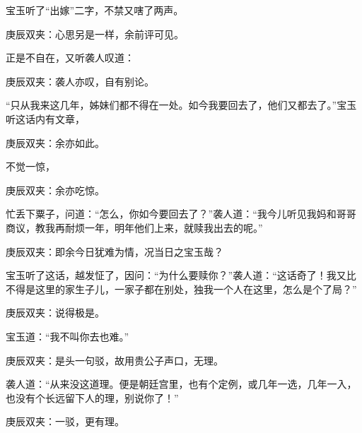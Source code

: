 \begin{parag}
    宝玉听了“出嫁”二字，不禁又嗐了两声。\begin{note}庚辰双夹：心思另是一样，余前评可见。\end{note}正是不自在，又听袭人叹道：\begin{note}庚辰双夹：袭人亦叹，自有别论。\end{note}“只从我来这几年，姊妹们都不得在一处。如今我要回去了，他们又都去了。”宝玉听这话内有文章，\begin{note}庚辰双夹：余亦如此。\end{note}不觉一惊，\begin{note}庚辰双夹：余亦吃惊。\end{note}忙丢下粟子，问道：“怎么，你如今要回去了？”袭人道：“我今儿听见我妈和哥哥商议，教我再耐烦一年，明年他们上来，就赎我出去的呢。”\begin{note}庚辰双夹：即余今日犹难为情，况当日之宝玉哉？\end{note}宝玉听了这话，越发怔了，因问：“为什么要赎你？”袭人道：“这话奇了！我又比不得是这里的家生子儿，一家子都在别处，独我一个人在这里，怎么是个了局？”\begin{note}庚辰双夹：说得极是。\end{note}宝玉道：“我不叫你去也难。”\begin{note}庚辰双夹：是头一句驳，故用贵公子声口，无理。\end{note}袭人道：“从来没这道理。便是朝廷宫里，也有个定例，或几年一选，几年一入，也没有个长远留下人的理，别说你了！”\begin{note}庚辰双夹：一驳，更有理。\end{note}
\end{parag}


